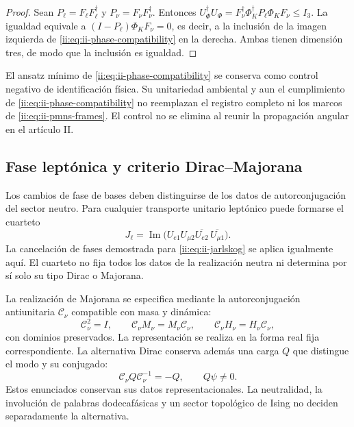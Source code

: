 \begin{proof}
Sean \(P_\ell=F_\ell F_\ell^\dagger\) y
\(P_\nu=F_\nu F_\nu^\dagger\). Entonces
\(U_\Phi^\dagger U_\Phi
=F_\nu^\dagger\Phi_K^\dagger P_\ell\Phi_KF_\nu\le I_3\).
La igualdad equivale a
\((I-P_\ell)\Phi_KF_\nu=0\), es decir, a la inclusión de la
imagen izquierda de \eqref{ii:eq:ii-phase-compatibility} en la derecha.
Ambas tienen dimensión tres, de modo que la inclusión es igualdad.
\end{proof}

El ansatz mínimo de \eqref{ii:eq:ii-phase-compatibility} se conserva como control
negativo de identificación física. Su unitariedad ambiental y aun el
cumplimiento de \eqref{ii:eq:ii-phase-compatibility} no reemplazan el
registro completo ni los marcos de \eqref{ii:eq:ii-pmns-frames}. El
control no se elimina al reunir la propagación angular en el artículo II.

\subsection{Fase leptónica y criterio Dirac--Majorana}

Los cambios de fase de bases deben distinguirse de los datos de
autorconjugación del sector neutro. Para cualquier transporte unitario
leptónico puede formarse el cuarteto
\begin{equation}
 J_\ell=\operatorname{Im}
 \bigl(U_{e1}U_{\mu2}\overline{U_{e2}}\,
                        \overline{U_{\mu1}}\bigr).
 \label{ii:eq:ii-leptonic-quartet}
\end{equation}
La cancelación de fases demostrada para \eqref{ii:eq:ii-jarlskog} se
aplica igualmente aquí. El cuarteto no fija todos los datos de la
realización neutra ni determina por sí solo su tipo Dirac o Majorana.

La realización de Majorana se especifica mediante la
autorconjugación antiunitaria \(\mathcal C_\nu\) compatible con masa y
dinámica:
\begin{equation}
 \mathcal C_\nu^2=I,\qquad
 \mathcal C_\nu M_\nu=M_\nu\mathcal C_\nu,\qquad
 \mathcal C_\nu H_\nu=H_\nu\mathcal C_\nu,
 \label{ii:eq:ii-majorana-compatibility}
\end{equation}
con dominios preservados. La representación se realiza en la forma real
fija correspondiente. La alternativa Dirac conserva además una carga
\(Q\) que distingue el modo y su conjugado:
\begin{equation}
 \mathcal C_\nu Q\mathcal C_\nu^{-1}=-Q,\qquad Q\psi\ne0.
 \label{ii:eq:ii-dirac-charge}
\end{equation}
Estos enunciados conservan sus datos representacionales. La neutralidad,
la involución de palabras dodecafásicas y un sector topológico de Ising
no deciden separadamente la alternativa.

